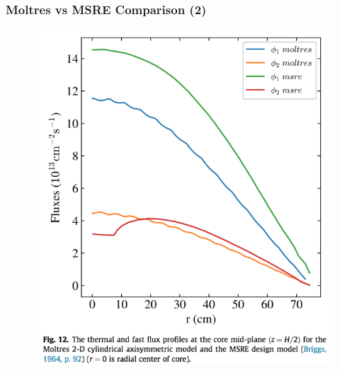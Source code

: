 \begin{frame}
  \frametitle{Moltres vs MSRE Comparison (2)}
  \begin{figure}[t]
   \includegraphics[height=0.85\textheight]{./images/msre_radial_flux.png}
    \end{figure}

\end{frame}

